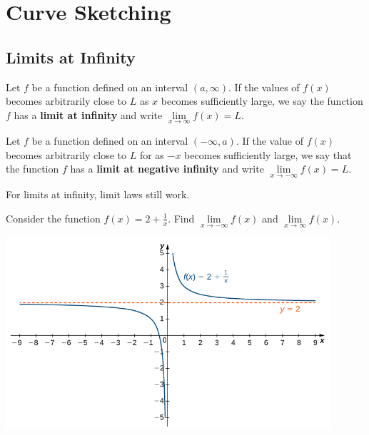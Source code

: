 
\hypertarget{curve-sketching}{%
\section{Curve Sketching}\label{curve-sketching}}

\hypertarget{limits-at-infinity}{%
\subsection{Limits at Infinity}\label{limits-at-infinity}}

\begin{definition}

Let \(f\) be a function defined on an interval \((a, \infty)\). If the
values of \(f(x)\) becomes arbitrarily close to \(L\) as \(x\) becomes
sufficiently large, we say the function \(f\) has a \textbf{limit at
infinity} and write \(\lim\limits_{x\to \infty}f(x)=L.\)

Let \(f\) be a function defined on an interval \((-\infty, a)\). If the
value of \(f(x)\) becomes arbitrarily close to \(L\) for as \(-x\)
becomes sufficiently large, we say that the function \(f\) has a
\textbf{limit at negative infinity} and write
\(\lim\limits_{x\to -\infty}f(x)=L.\)

\end{definition}


\begin{remark}

For limits at infinity, limit laws still work.

\end{remark}

\begin{example}

Consider the function \(f(x)=2+\frac1x\). Find
\(\lim\limits_{x\to -\infty}f(x)\) and
\(\lim\limits_{x\to \infty}f(x)\).

\includegraphics[width=0.9\textwidth]{img/image-20200415101551680.png}

\end{example}
\vspace*{2\baselineskip}

